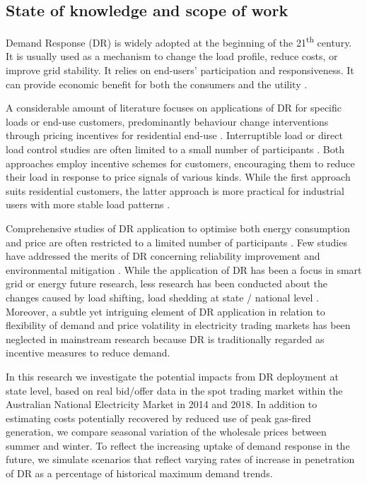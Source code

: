 \documentclass{pasa}%
\begin{document}
\subsection{State of knowledge and scope of work}
Demand Response (DR) is widely adopted at the beginning of the 21\textsuperscript{th} century. It is usually used as a mechanism to change the load profile, reduce costs, or improve grid stability. It relies on end-users' participation and responsiveness. It can provide economic benefit for both the consumers and the utility \cite{eu27,vardakas2015,siano2014}.

A considerable amount of literature focuses on applications of DR for specific loads or end-use customers, predominantly behaviour change interventions through pricing incentives for  residential end-use \cite{henley1994,george2002, herter2007,wang2011,torriti2013,downer2016}. Interruptible load or direct load control studies are often limited to a small number of participants \cite{alizadeh2012,vandoorn2015,zaidi2010}. Both approaches employ incentive schemes for customers, encouraging them to reduce their load in response to price signals of various kinds. While the first approach suits residential customers, the latter approach is more practical for industrial users with more stable load patterns \cite{vardakas2015}.

Comprehensive studies of DR application to optimise both energy consumption and price are often restricted to a limited number of participants \cite{mohsenian-Rad2010,pipattanasomporn2012,valogianni2016}. Few studies have addressed the merits of DR concerning reliability improvement and environmental mitigation \cite{wang2017}. While the application of DR has been a focus in smart grid or energy future research, less research has been conducted about the changes caused by load shifting, load shedding at state / national level \cite{markle2018}. Moreover, a subtle yet intriguing element of DR application in relation to flexibility of demand and price volatility in electricity trading markets has been neglected in mainstream research because DR is traditionally regarded as incentive measures to reduce demand.

In this research we investigate the potential impacts from DR deployment at state level, based on real bid/offer data in the spot trading market within the Australian National Electricity Market in 2014 and 2018. In addition to estimating costs potentially recovered by reduced use  of peak gas-fired generation, we compare seasonal variation of the wholesale prices between summer and winter. To reflect the increasing uptake of demand response in the future, we simulate scenarios that reflect varying rates of increase in penetration of DR as a percentage of historical maximum demand trends.
\end{document}
